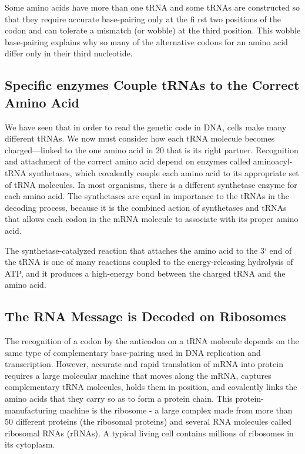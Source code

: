 Some amino acids have more than one tRNA and some tRNAs are constructed so that
they require accurate base-pairing only at the fi rst two positions of the
codon and can tolerate a mismatch (or wobble) at the third position. This
wobble base-pairing explains why so many of the alternative codons
for an amino acid differ only in their third nucleotide.

\subsection{Specific enzymes Couple tRNAs to the Correct Amino Acid}

We have seen that in order to read the genetic code in DNA, cells make
many different tRNAs. We now must consider how each tRNA molecule
becomes charged—linked to the one amino acid in 20 that is its right partner.
Recognition and attachment of the correct amino acid depend on
enzymes called aminoacyl-tRNA synthetases, which covalently couple
each amino acid to its appropriate set of tRNA molecules. In most organisms,
there is a different synthetase enzyme for each amino acid. The
synthetases are equal in importance to the tRNAs in the decoding process,
because it is the combined action of synthetases and tRNAs that
allows each codon in the mRNA molecule to associate with its proper
amino acid.

The synthetase-catalyzed reaction that attaches the amino acid to the 3`
end of the tRNA is one of many reactions coupled to the energy-releasing
hydrolysis of ATP, and it produces a high-energy bond
between the charged tRNA and the amino acid.

\subsection{The RNA Message is Decoded on Ribosomes}

The recognition of a codon by the anticodon on a tRNA molecule depends
on the same type of complementary base-pairing used in DNA replication
and transcription. However, accurate and rapid translation of mRNA
into protein requires a large molecular machine that moves along the
mRNA, captures complementary tRNA molecules, holds them in position,
and covalently links the amino acids that they carry so as to form a
protein chain. This protein-manufacturing machine is the ribosome - a
large complex made from more than 50 different proteins (the ribosomal
proteins) and several RNA molecules called ribosomal RNAs (rRNAs). A
typical living cell contains millions of ribosomes in its cytoplasm.

